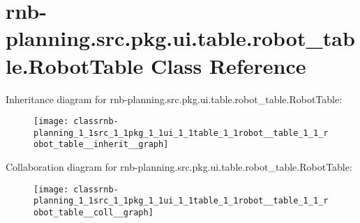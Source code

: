 \hypertarget{classrnb-planning_1_1src_1_1pkg_1_1ui_1_1table_1_1robot__table_1_1_robot_table}{}\section{rnb-\/planning.src.\+pkg.\+ui.\+table.\+robot\+\_\+table.\+Robot\+Table Class Reference}
\label{classrnb-planning_1_1src_1_1pkg_1_1ui_1_1table_1_1robot__table_1_1_robot_table}


Inheritance diagram for rnb-\/planning.src.\+pkg.\+ui.\+table.\+robot\+\_\+table.\+Robot\+Table\+:\nopagebreak
\begin{figure}[H]
\begin{center}
\leavevmode
\texttt{[image: classrnb-planning\_1\_1src\_1\_1pkg\_1\_1ui\_1\_1table\_1\_1robot\_\_table\_1\_1\_robot\_table\_\_inherit\_\_graph]}
\end{center}
\end{figure}


Collaboration diagram for rnb-\/planning.src.\+pkg.\+ui.\+table.\+robot\+\_\+table.\+Robot\+Table\+:\nopagebreak
\begin{figure}[H]
\begin{center}
\leavevmode
\texttt{[image: classrnb-planning\_1\_1src\_1\_1pkg\_1\_1ui\_1\_1table\_1\_1robot\_\_table\_1\_1\_robot\_table\_\_coll\_\_graph]}
\end{center}
\end{figure}
